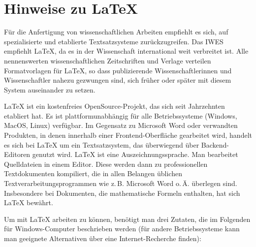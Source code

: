 \chapter{Hinweise zu \LaTeX{}}
\label{cha:latex_DE}

Für die Anfertigung von wissenschaftlichen Arbeiten empfiehlt es sich, auf spezialisierte und etablierte Textsatzsysteme zurückzugreifen. Das IWES empfiehlt \LaTeX{}, da es in der Wissenschaft international weit verbreitet ist. Alle nennenswerten wissenschaftlichen Zeitschriften und Verlage verteilen Formatvorlagen für \LaTeX{}, so dass publizierende Wissenschaftlerinnen und Wissenschaftler nahezu gezwungen sind, sich früher oder später mit diesem System auseinander zu setzen.

\LaTeX{} ist ein kostenfreies OpenSource-Projekt, das sich seit Jahrzehnten etabliert hat. Es ist plattformunabhängig für alle Betriebssysteme (Windows, MacOS, Linux) verfügbar. Im Gegensatz zu Microsoft Word oder verwandten Produkten, in denen innerhalb einer Frontend-Oberfläche gearbeitet wird, handelt es sich bei \LaTeX{} um ein Textsatzsystem, das überwiegend über Backend-Editoren genutzt wird. \LaTeX{} ist eine Auszeichnungssprache. Man bearbeitet Quelldateien in einem Editor. Diese werden dann zu professionellen Textdokumenten kompiliert, die in allen Belangen üblichen Textverarbeitungsprogrammen wie z.\,B. Microsoft Word o.\,Ä. überlegen sind. Insbesondere bei Dokumenten, die mathematische Formeln enthalten, hat sich \LaTeX{} bewährt.

Um mit \LaTeX{} arbeiten zu können, benötigt man drei Zutaten, die im Folgenden für Windows-Computer beschrieben werden (für andere Betriebssysteme kann man geeignete Alternativen über eine Internet-Recherche finden):

